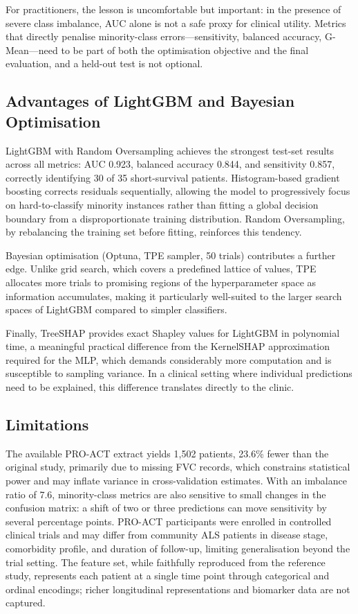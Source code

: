 \documentclass[a4paper,twoside]{article}
\begin{document}
For practitioners, the lesson is uncomfortable but important: in the presence
of severe class imbalance, AUC alone is not a safe proxy for clinical utility.
Metrics that directly penalise minority-class errors---sensitivity, balanced
accuracy, G-Mean---need to be part of both the optimisation objective and the
final evaluation, and a held-out test is not optional.

\subsection{Advantages of LightGBM and Bayesian Optimisation}

LightGBM with Random Oversampling achieves the strongest test-set results across
all metrics: AUC 0.923, balanced accuracy 0.844, and sensitivity 0.857, correctly
identifying 30 of 35 short-survival patients. Histogram-based gradient boosting corrects residuals
sequentially, allowing the model to progressively focus on hard-to-classify
minority instances rather than fitting a global decision boundary from a
disproportionate training distribution. Random Oversampling, by rebalancing the
training set before fitting, reinforces this tendency.

Bayesian optimisation (Optuna, TPE sampler, 50 trials) contributes a further edge. Unlike grid search, which covers a predefined lattice of values, TPE allocates
more trials to promising regions of the hyperparameter space as information
accumulates, making it particularly well-suited to the larger search spaces of
LightGBM compared to simpler classifiers.

Finally, TreeSHAP provides exact Shapley values for LightGBM in polynomial
time, a meaningful practical difference from the KernelSHAP approximation
required for the MLP, which demands considerably more computation and is
susceptible to sampling variance. In a clinical setting where individual
predictions need to be explained, this difference translates directly to the clinic.

\subsection{Limitations}

The available PRO-ACT extract yields 1,502 patients, 23.6\% fewer than the
original study, primarily due to missing FVC records, which constrains
statistical power and may inflate variance in cross-validation estimates.
With an imbalance ratio of 7.6, minority-class metrics are also sensitive to
small changes in the confusion matrix: a shift of two or three predictions can
move sensitivity by several percentage points. PRO-ACT participants were
enrolled in controlled clinical trials and may differ from community ALS patients
in disease stage, comorbidity profile, and duration of follow-up, limiting 
generalisation beyond the trial setting. The feature set, while faithfully
reproduced from the reference study, represents each patient at a single time
point through categorical and ordinal encodings; richer longitudinal
representations and biomarker data are not captured.
\end{document}
